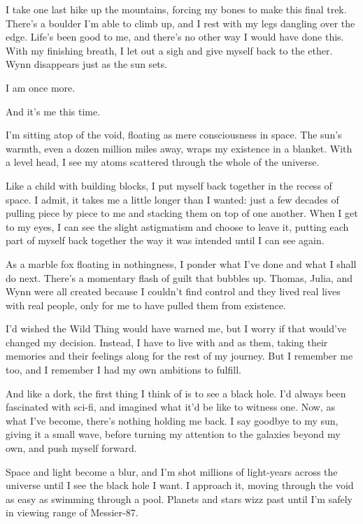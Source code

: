 I take one last hike up the mountains, forcing my bones to make this final trek. There's a boulder I'm able to climb up, and I rest with my legs dangling over the edge. Life's been good to me, and there's no other way I would have done this. With my finishing breath, I let out a sigh and give myself back to the ether. Wynn disappears just as the sun sets.

I am once more.

And it's me this time.

I'm sitting atop of the void, floating as mere consciousness in space. The sun's warmth, even a dozen million miles away, wraps my existence in a blanket. With a level head, I see my atoms scattered through the whole of the universe.

Like a child with building blocks, I put myself back together in the recess of space. I admit, it takes me a little longer than I wanted: just a few decades of pulling piece by piece to me and stacking them on top of one another. When I get to my eyes, I can see the slight astigmatism and choose to leave it, putting each part of myself back together the way it was intended until I can see again.

As a marble fox floating in nothingness, I ponder what I've done and what I shall do next. There's a momentary flash of guilt that bubbles up. Thomas, Julia, and Wynn were all created because I couldn't find control and they lived real lives with real people, only for me to have pulled them from existence.

I'd wished the Wild Thing would have warned me, but I worry if that would've changed my decision. Instead, I have to live with and as them, taking their memories and their feelings along for the rest of my journey. But I remember me too, and I remember I had my own ambitions to fulfill.

And like a dork, the first thing I think of is to see a black hole. I'd always been fascinated with sci-fi, and imagined what it'd be like to witness one. Now, as what I've become, there's nothing holding me back. I say goodbye to my sun, giving it a small wave, before turning my attention to the galaxies beyond my own, and push myself forward.

Space and light become a blur, and I'm shot millions of light-years across the universe until I see the black hole I want. I approach it, moving through the void as easy as swimming through a pool. Planets and stars wizz past until I'm safely in viewing range of Messier-87.

